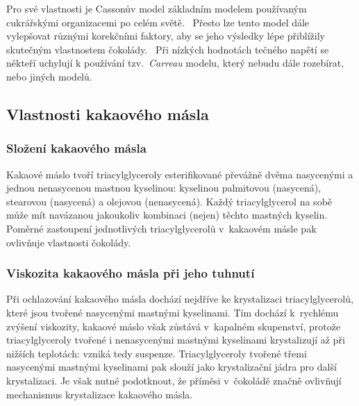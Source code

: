 \documentclass[12pt]{article}
\begin{document}
\par\noindent
Pro své vlastnosti je Cassonův model základním modelem používaným cukrářskými organizacemi po celém světě.~\cite{Article:Determination_of_chocolate_viscosity} Přesto lze tento model dále vylepšovat různými korekčními faktory, aby se jeho výsledky lépe přiblížily skutečným vlastnostem čokolády.~\cite{Article:Determination_of_chocolate_viscosity} Při nízkých hodnotách tečného napětí se někteří uchylují k používání tzv.~\emph{Carreau} modelu, který nebudu dále rozebírat, nebo jiných modelů.~\cite{Article:Flow_properties_molten_chocolate}\cite{material:Tokove_chovani_reologicke_modely}

\subsection{Vlastnosti kakaového másla}%

\subsubsection{Složení kakaového másla}%

Kakaové máslo tvoří triacylglyceroly esterifikované převážně dvěma nasycenými a jednou nenasycenou mastnou kyselinou: kyselinou palmitovou (nasycená), stearovou (nasycená) a olejovou (nenasycená). Každý triacylglycerol na sobě může mít navázanou jakoukoliv kombinaci (nejen) těchto mastných kyselin. Poměrné zastoupení jednotlivých triacylglycerolů v~kakaovém másle pak ovlivňuje vlastnosti čokolády.~\cite{Article:precrystallization}\cite{wiki:Triacylglycerol}

\subsubsection{Viskozita kakaového másla při jeho tuhnutí}%

Při ochlazování kakaového másla dochází nejdříve ke krystalizaci triacylglycerolů, které jsou tvořené nasycenými mastnými kyselinami. Tím dochází k~rychlému zvýšení viskozity, kakaové máslo však zůstává v~kapalném skupenství, protože triacylglyceroly tvořené i nenasycenými mastnými kyselinami krystalizují až při nižších teplotách: vzniká tedy suspenze\footnotemark. Triacylglyceroly tvořené třemi nasycenými mastnými kyselinami pak slouží jako krystalizační jádra pro další krystalizaci. Je však nutné podotknout, že příměsi v~čokoládě značně ovlivňují mechanismus krystalizace kakaového másla.~\cite{Article:precrystallization}
\end{document}
